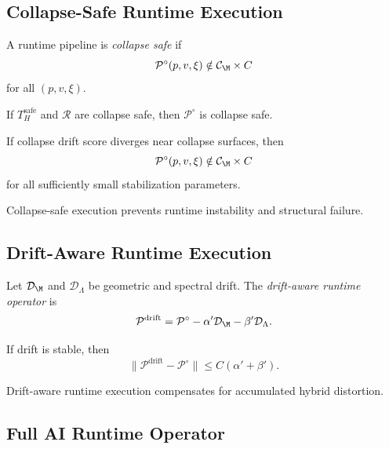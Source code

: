 \subsection{Collapse-Safe Runtime Execution}

\begin{definition}
A runtime pipeline is \emph{collapse safe} if
\[
\mathcal{P}^\circ(p,v,\xi)
\notin \mathcal{C}_\M \times C
\]
for all $(p,v,\xi)$.
\end{definition}

\begin{lemma}
If $T_H^\mathrm{safe}$ and $\mathcal{R}$ are collapse safe, then
$\mathcal{P}^\circ$ is collapse safe.
\end{lemma}

\begin{theorem}
If collapse drift score diverges near collapse surfaces, then
\[
\mathcal{P}^\circ(p,v,\xi)
\notin \mathcal{C}_\M \times C
\]
for all sufficiently small stabilization parameters.
\end{theorem}

\begin{remark}
Collapse-safe execution prevents runtime instability and structural failure.
\end{remark}

\subsection{Drift-Aware Runtime Execution}

\begin{definition}
Let $\mathcal{D}_\M$ and $\mathcal{D}_\Lambda$ be geometric and spectral drift.
The \emph{drift-aware runtime operator} is
\[
\mathcal{P}^\mathrm{drift}
= \mathcal{P}^\circ
- \alpha' \mathcal{D}_\M
- \beta' \mathcal{D}_\Lambda.
\]
\end{definition}

\begin{lemma}
If drift is stable, then
\[
\| \mathcal{P}^\mathrm{drift} - \mathcal{P}^\circ \|
\le C (\alpha' + \beta').
\]
\end{lemma}

\begin{remark}
Drift-aware runtime execution compensates for accumulated hybrid distortion.
\end{remark}

\subsection{Full AI Runtime Operator}

